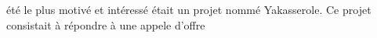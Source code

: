 \documentclass[a4paper, 11pt, french]{report}
\begin{document}
                                                                                                                            été
                                                                                                                            le
                                                                                                                            plus
                                                                                                                            motivé
                                                                                                                            et
                                                                                                                            intéressé
                                                                                                                            était
                                                                                                                            un
                                                                                                                            projet
                                                                                                                            nommé
                                                                                                                            Yakasserole.
                                                                                                                            Ce
                                                                                                                            projet
                                                                                                                            consistait
                                                                                                                            à
                                                                                                                            répondre
                                                                                                                            à
                                                                                                                            une
                                                                                                                            appele
                                                                                                                            d'offre
\end{document}
